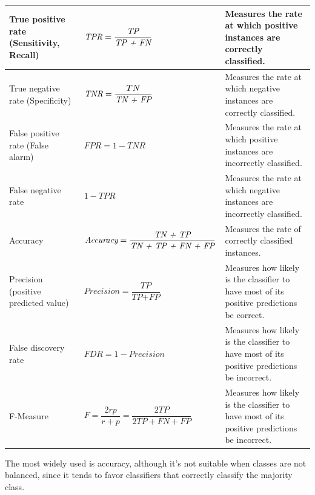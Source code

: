 \bgroup
\def\arraystretch{1.5}%
\begin{table}[ht]
\scriptsize
    \centering
    \begin{tabular}{ 
    | >{\centering\arraybackslash}p{90pt}
    | >{\centering\arraybackslash}p{140pt}
    | >{\centering\arraybackslash}m{100pt} | }
    
    \hline
        True positive rate (Sensitivity, Recall) & $\textit{TPR} = \dfrac{\textit{TP}}{\textit{\textit{TP} + FN}}$ & Measures the rate at which positive instances are correctly classified. \\
        \hline
        True negative rate (Specificity) & $\textit{TNR} = \dfrac{TN}{\textit{\textit{TN} + FP}}$ & Measures the rate at which negative instances are correctly classified. \\
        \hline
        False positive rate (False alarm) & $\textit{FPR} = 1 - \textit{TNR}$ & Measures the rate at which positive instances are incorrectly classified. \\
        \hline
        False negative rate & $1 - \textit{TPR}$ & Measures the rate at which negative instances are incorrectly classified. \\
        \hline
        Accuracy & $\textit{Accuracy} = \dfrac{\textit{\textit{TN} + TP}}{\textit{\textit{TN} + \textit{TP} + \textit{FN} + FP}}$ &  Measures the rate of correctly classified instances. \\
        \hline
        Precision (positive predicted value) & $\textit{Precision} = \dfrac{\textit{TP}}{\textit{TP} + \textit{FP}}$ & Measures how likely is the classifier to have most of its positive predictions be correct. \\
        \hline
        False discovery rate & $\textit{FDR} = 1 - \textit{Precision}$ & Measures how likely is the classifier to have most of its positive predictions be incorrect. \\
        \hline
        F-Measure & $F = \dfrac{2rp}{r+p} = \dfrac{\textit{2TP}}{2\textit{TP} + \textit{FN} + \textit{FP}}$ & Measures how likely is the classifier to have most of its positive predictions be incorrect. \\
    \hline
    \end{tabular}
\end{table}
\egroup

\clearpage

The most widely used is accuracy, although it's not suitable when classes are not balanced, since it tends to favor classifiers that correctly classify the majority class.

